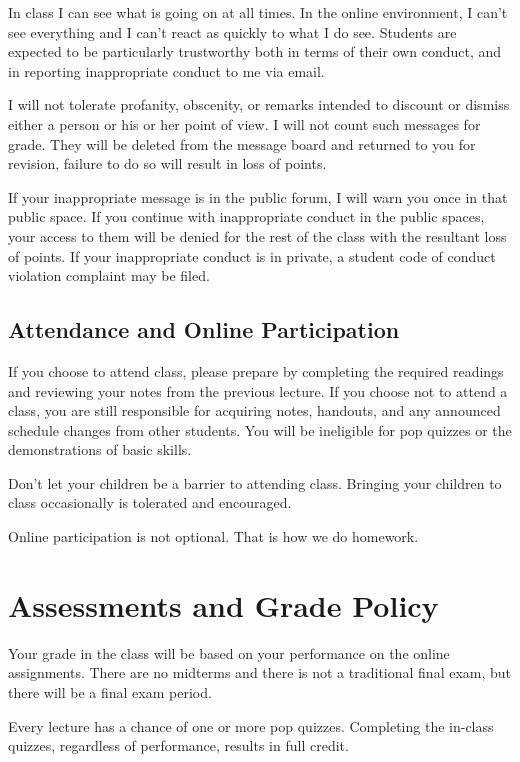 \documentclass[letterpaper,10pt]{article}
\begin{document}
In class I can see what is going on at all times.  In the online
environment, I can't see everything and I can't react as quickly to
what I do see.  Students are expected to be particularly trustworthy
both in terms of their own conduct, and in reporting inappropriate
conduct to me via email.

I will not tolerate profanity, obscenity, or remarks intended to
discount or dismiss either a person or his or her point of view. I
will not count such messages for grade. They will be deleted from the
message board and returned to you for revision, failure to do so will
result in loss of points.

If your inappropriate message is in the public forum, I will warn you
once in that public space. If you continue with inappropriate conduct
in the public spaces, your access to them will be denied for the rest
of the class with the resultant loss of points. If your inappropriate
conduct is in private, a student code of conduct violation complaint
may be filed.

\subsection{Attendance and Online Participation}

If you choose to attend class, please prepare by
completing the required readings and reviewing your notes from the
previous lecture. If you choose not to attend a class, you are still
responsible for acquiring notes, handouts, and any announced schedule
changes from other students.  You will be ineligible for pop quizzes
or the demonstrations of basic skills.

Don't let your children be a barrier to attending class. Bringing your
children to class occasionally is tolerated and encouraged.

Online participation is not optional.  That is how we do homework.

\section{Assessments and Grade Policy}

Your grade in the class will be based on your performance on the
online assignments.  There are no midterms and there is
not a traditional final exam, but there will be a final exam period.

Every lecture has a chance of one or more pop quizzes. Completing the
in-class quizzes, regardless of performance, results in full credit.
\end{document}
